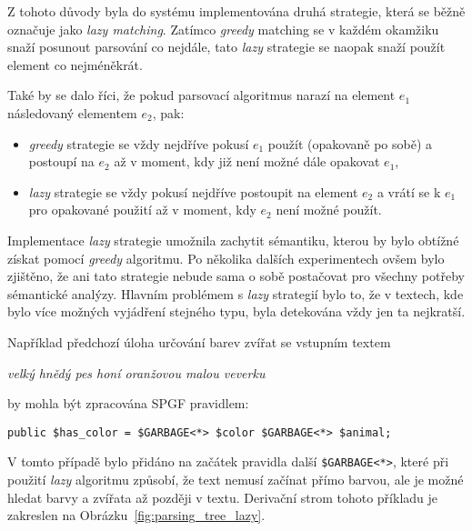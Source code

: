 Z tohoto důvody byla do systému implementována druhá strategie, která se běžně označuje jako \emph{lazy matching}.
Zatímco \emph{greedy} matching se v každém okamžiku snaží posunout parsování co nejdále, tato \emph{lazy} strategie se naopak snaží použít element co nejméněkrát.

Také by se dalo říci, že pokud parsovací algoritmus narazí na element $e_{1}$ následovaný elementem $e_{2}$, pak:
\begin{itemize}
	\item \emph{greedy} strategie se vždy nejdříve pokusí $e_{1}$ použít (opakovaně po sobě) a postoupí na $e_{2}$ až v moment, kdy
	      již není možné dále opakovat $e_{1}$,
	\item \emph{lazy} strategie se vždy pokusí nejdříve postoupit na element $e_{2}$ a vrátí se k $e_{1}$ pro opakované použití až v moment,
	      kdy $e_{2}$ není možné použít.
\end{itemize}

Implementace \emph{lazy} strategie umožnila zachytit sémantiku, kterou by bylo obtížné získat pomocí \emph{greedy} algoritmu.
Po několika dalších experimentech ovšem bylo zjištěno, že ani tato strategie nebude sama o sobě postačovat pro všechny potřeby sémantické analýzy.
Hlavním problémem s \emph{lazy} strategií bylo to, že v textech, kde bylo více možných vyjádření stejného typu, byla detekována vždy jen ta nejkratší.

\newpage
Například předchozí úloha určování barev zvířat se vstupním textem
\begin{center}
	\emph{velký hnědý pes honí oranžovou malou veverku}
\end{center}
by mohla být zpracována SPGF pravidlem:
\begin{center}
	\texttt{public \$has\_color = \$GARBAGE<*> \$color \$GARBAGE<*> \$animal;}
\end{center}
V tomto případě bylo přidáno na začátek pravidla další \texttt{\$GARBAGE<*>}, které při použití \emph{lazy} algoritmu způsobí,
že text nemusí začínat přímo barvou, ale je možné hledat barvy a zvířata až později v textu.
Derivační strom tohoto příkladu je zakreslen na Obrázku~\ref{fig:parsing_tree_lazy}.

